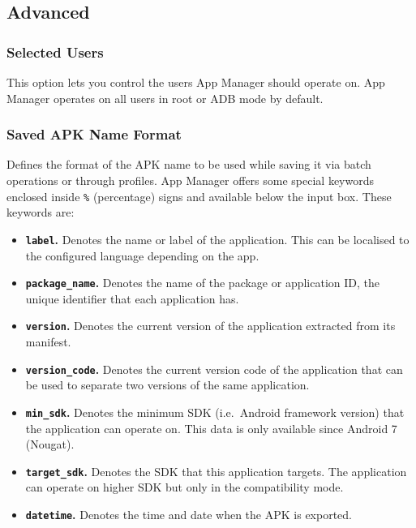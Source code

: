 \subsection{Advanced}\label{subsec:advanced} %

\subsubsection{Selected Users}\label{subsubsec:selected-users} %
This option lets you control the users App Manager should operate on. App Manager operates on all users in root or ADB mode by default.

\subsubsection{Saved APK Name Format}\label{subsubsec:saved-apk-name-format} %
Defines the format of the APK name to be used while saving it via batch operations or through profiles.
App Manager offers some special keywords enclosed inside \texttt{\%} (percentage) signs and available below the input box.
These keywords are:
\begin{itemize}
    \item \textbf{\texttt{label}.} Denotes the name or label of the application. This can be localised to the configured language depending on the app.
    \item \textbf{\texttt{package\_name}.} Denotes the name of the package or application ID, the unique identifier that each application has.
    \item \textbf{\texttt{version}.} Denotes the current version of the application extracted from its manifest.
    \item \textbf{\texttt{version\_code}.} Denotes the current version code of the application that can be used to separate two versions of the same application.
    \item \textbf{\texttt{min\_sdk}.} Denotes the minimum SDK (i.e.\ Android framework version) that the application can operate on. This data is only available since Android 7 (Nougat).
    \item \textbf{\texttt{target\_sdk}.} Denotes the SDK that this application targets. The application can operate on higher SDK but only in the compatibility mode.
    \item \textbf{\texttt{datetime}.} Denotes the time and date when the APK is exported.
\end{itemize}

